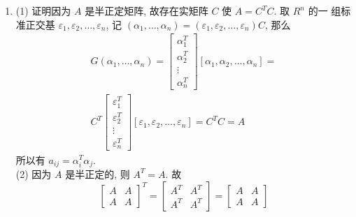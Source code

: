 \documentclass{article}
\begin{document}
\begin{enumerate}[\qquad 证明：]
    \item (1) 证明因为 $A$ 是半正定矩阵, 故存在实矩阵 $C$ 使 $A=C^{T} C .$ 取 $R^{n}$ 的一 组标准正交基 $\varepsilon_{1}, \varepsilon_{2}, \ldots, \varepsilon_{n}$, 记 $\left(\alpha_{1}, \ldots, \alpha_{n}\right)=\left(\varepsilon_{1}, \varepsilon_{2}, \ldots, \varepsilon_{n}\right) C$, 那么
          $$
              \begin{array}{c}
                  G\left(\alpha_{1}, \ldots, \alpha_{n}\right)=\left[\begin{array}{c}
                          \alpha_{1}^{T} \\
                          \alpha_{2}^{T} \\
                          \vdots         \\
                          \alpha_{n}^{T}
                      \end{array}\right]\left[\alpha_{1}, \alpha_{2}, \ldots, \alpha_{n}\right]= \\
                  C^{T}\left[\begin{array}{c}
                          \varepsilon_{1}^{T} \\
                          \varepsilon_{2}^{T} \\
                          \vdots              \\
                          \varepsilon_{n}^{T}
                      \end{array}\right]\left[\varepsilon_{1}, \varepsilon_{2}, \ldots, \varepsilon_{n}\right]=C^{T} C=A
              \end{array}
          $$
          所以有 $a_{i j}=\alpha_{i}^{T} \alpha_{j} $. \\
          (2) 因为 $A$ 是半正定的, 则 $A^{T}=A .$ 故
          $$
              \left[\begin{array}{ll}
                      A & A \\
                      A & A
                  \end{array}\right]^{T}=\left[\begin{array}{ll}
                      A^{T} & A^{T} \\
                      A^{T} & A^{T}
                  \end{array}\right]=\left[\begin{array}{ll}
                      A & A \\
                      A & A
                  \end{array}\right]
$$
\end{enumerate}
\end{document}
